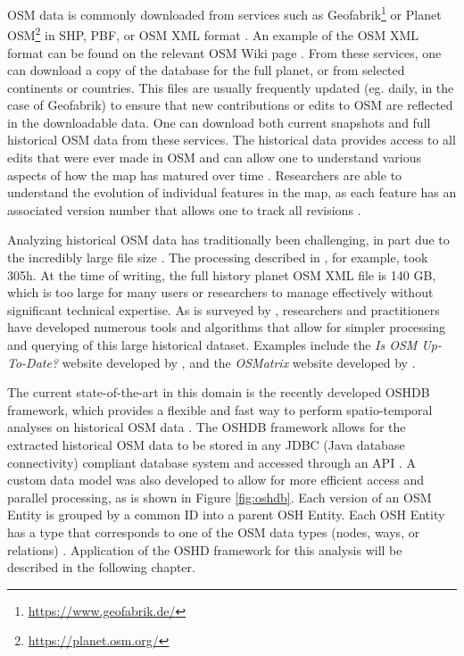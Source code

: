 OSM data is commonly downloaded from services such as Geofabrik\footnote{\url{https://www.geofabrik.de/}} or Planet OSM\footnote{\url{https://planet.osm.org/}} in SHP, PBF, or OSM XML format \parencite{mooney_accessing_2011}. An example of the OSM XML format can be found on the relevant OSM Wiki page \parencite{noauthor_osm_2017}. From these services, one can download a copy of the database for the full planet, or from selected continents or countries. This files are usually frequently updated (eg. daily, in the case of Geofabrik) to ensure that new contributions or edits to OSM are reflected in the downloadable data. One can download both current snapshots and full historical OSM data from these services. The historical data provides access to all edits that were ever made in OSM and can allow one to understand various aspects of how the map has matured over time \parencite{corcoran_analysing_2013, mooney_characteristics_2012}. Researchers are able to understand the evolution of individual features in the map, as each feature has an associated version number that allows one to track all revisions \parencite{noauthor_elements_2020}. 

Analyzing historical OSM data has traditionally been challenging, in part due to the incredibly large file size \parencite{raifer_oshdb_2019, mooney_accessing_2011}. The processing described in \textcite{mooney_characteristics_2012}, for example, took 305h. At the time of writing, the full history planet OSM XML file is 140 GB, which is too large for many users or researchers to manage effectively without significant technical expertise. As is surveyed by \textcite{raifer_oshdb_2019}, researchers and practitioners have developed numerous tools and algorithms that allow for simpler processing and querying of this large historical dataset. Examples include the \textit{Is OSM Up-To-Date?} website developed by \textcite{minghini_open_2018}, and the \textit{OSMatrix} website developed by \textcite{roick_technical_2012}. 

The current state-of-the-art in this domain is the recently developed OSHDB framework, which provides a flexible and fast way to perform spatio-temporal analyses on historical OSM data \parencite{raifer_oshdb_2019}. The OSHDB framework allows for the extracted historical OSM data to be stored in any JDBC (Java database connectivity) compliant database system and accessed through an API \parencite{raifer_oshdb_2019}. A custom data model was also developed to allow for more efficient access and parallel processing, as is shown in Figure \ref{fig:oshdb}. Each version of an OSM Entity is grouped by a common ID into a parent OSH Entity. Each OSH Entity has a type that corresponds to one of the OSM data types (nodes, ways, or relations) \parencite{raifer_oshdb_2019}. Application of the OSHD framework for this analysis will be described in the following chapter.

